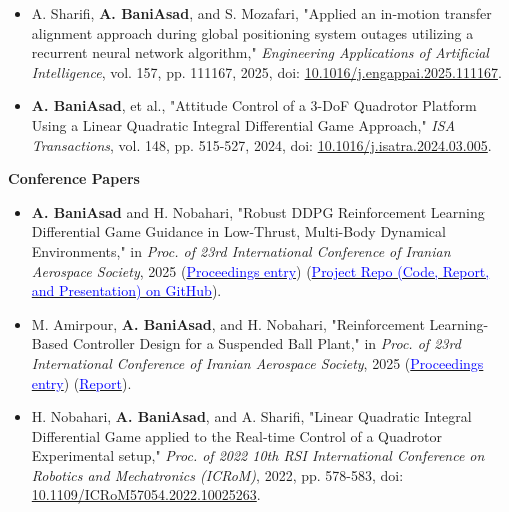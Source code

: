 \documentclass[12pt]{article}
\newcommand{\etal}{{et al.}}
\begin{document}
\begin{itemize} \itemsep -1pt %
	\item A. Sharifi, \textbf{A. BaniAsad}, and S. Mozafari, "Applied an in-motion transfer alignment approach during global positioning system outages utilizing a recurrent neural network algorithm," \textit{Engineering Applications of Artificial Intelligence}, vol. 157, pp. 111167, 2025, doi: \href{https://doi.org/10.1016/j.engappai.2025.111167}{10.1016/j.engappai.2025.111167}.
	\item \textbf{A. BaniAsad}, et al., "Attitude Control of a 3-DoF Quadrotor Platform Using a Linear Quadratic Integral Differential Game Approach," \textit{ISA Transactions}, vol. 148, pp. 515-527, 2024, doi: \href{https://doi.org/10.1016/j.isatra.2024.03.005}{10.1016/j.isatra.2024.03.005}.
\end{itemize}

\noindent
{\bfseries Conference Papers}

\begin{itemize} \itemsep -1pt %
    \item \textbf{A. BaniAsad} and H. Nobahari, "Robust DDPG Reinforcement Learning Differential Game Guidance in Low-Thrust, Multi-Body Dynamical Environments," in \textit{Proc. of 23rd International Conference of Iranian Aerospace Society}, 2025 (\href{https://civilica.com/doc/2403704/}{\textcolor{blue}{Proceedings entry}}) (\href{https://github.com/alibaniasad1999/DGDDPG}{\textcolor{blue}{Project Repo (Code, Report, and Presentation) on GitHub}}).
    \item M. Amirpour, \textbf{A. BaniAsad}, and H. Nobahari, "Reinforcement Learning-Based Controller Design for a Suspended Ball Plant," in \textit{Proc. of 23rd International Conference of Iranian Aerospace Society}, 2025 (\href{https://civilica.com/doc/2403916/}{\textcolor{blue}{Proceedings entry}}) 
   (\href{https://drive.google.com/file/d/18oinC3TNsnMand_cw5BN_Z3qxRAvds8u/view?usp=sharing}{\textcolor{blue}{Report}}).
	\item H. Nobahari, \textbf{A. BaniAsad}, and A. Sharifi, "Linear Quadratic Integral Differential Game applied to the Real-time Control of a Quadrotor Experimental setup," \textit{Proc. of 2022 10th RSI International Conference on Robotics and Mechatronics (ICRoM)}, 2022, pp. 578-583, doi: \href{https://doi.org/10.1109/ICRoM57054.2022.10025263}{10.1109/ICRoM57054.2022.10025263}.
\end{itemize}
\end{document}
